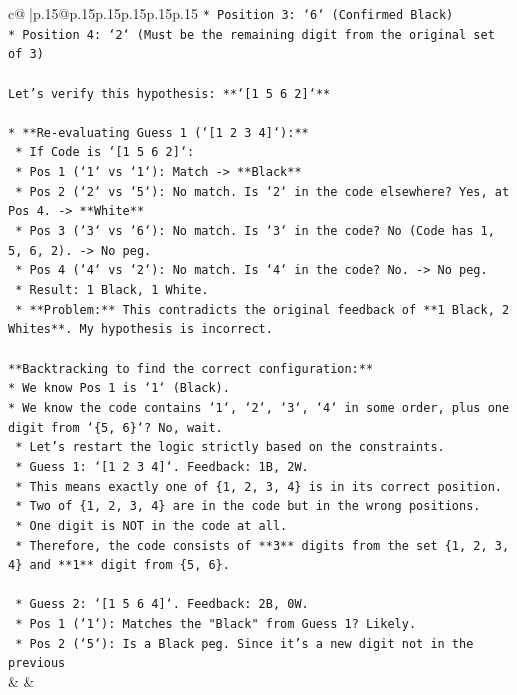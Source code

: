\documentclass{article}
\begin{document}
{\begin{supertabular}{c@{$\;$}|p{.15\linewidth}@{}p{.15\linewidth}p{.15\linewidth}p{.15\linewidth}p{.15\linewidth}p{.15\linewidth}}
{{{\texttt{*   Position 3: `6` (Confirmed Black)} \\
\texttt{*   Position 4: `2` (Must be the remaining digit from the original set of 3)} \\
\\ 
\texttt{Let's verify this hypothesis: **`{[}1 5 6 2{]}`**} \\
\\ 
\texttt{*   **Re{-}evaluating Guess 1 (`{[}1 2 3 4{]}`):**} \\
\texttt{    *   If Code is `{[}1 5 6 2{]}`:} \\
\texttt{        *   Pos 1 (`1` vs `1`): Match {-}> **Black**} \\
\texttt{        *   Pos 2 (`2` vs `5`): No match. Is `2` in the code elsewhere? Yes, at Pos 4. {-}> **White**} \\
\texttt{        *   Pos 3 (`3` vs `6`): No match. Is `3` in the code? No (Code has 1, 5, 6, 2). {-}> No peg.} \\
\texttt{        *   Pos 4 (`4` vs `2`): No match. Is `4` in the code? No. {-}> No peg.} \\
\texttt{    *   Result: 1 Black, 1 White.} \\
\texttt{    *   **Problem:** This contradicts the original feedback of **1 Black, 2 Whites**. My hypothesis is incorrect.} \\
\\ 
\texttt{**Backtracking to find the correct configuration:**} \\
\texttt{*   We know Pos 1 is `1` (Black).} \\
\texttt{*   We know the code contains `1`, `2`, `3`, `4` in some order, plus one digit from `\{5, 6\}`? No, wait.} \\
\texttt{    *   Let's restart the logic strictly based on the constraints.} \\
\texttt{    *   Guess 1: `{[}1 2 3 4{]}`. Feedback: 1B, 2W.} \\
\texttt{        *   This means exactly one of \{1, 2, 3, 4\} is in its correct position.} \\
\texttt{        *   Two of \{1, 2, 3, 4\} are in the code but in the wrong positions.} \\
\texttt{        *   One digit is NOT in the code at all.} \\
\texttt{        *   Therefore, the code consists of **3** digits from the set \{1, 2, 3, 4\} and **1** digit from \{5, 6\}.} \\
\\ 
\texttt{    *   Guess 2: `{[}1 5 6 4{]}`. Feedback: 2B, 0W.} \\
\texttt{        *   Pos 1 (`1`): Matches the "Black" from Guess 1? Likely.} \\
\texttt{        *   Pos 2 (`5`): Is a Black peg. Since it's a new digit not in the previous} \\
            }
        }
    }
    & & \\ \\


\end{supertabular}}
\end{document}
